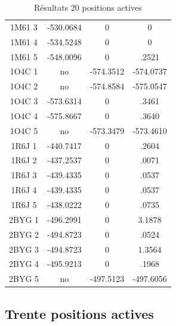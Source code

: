 \documentclass[a4paper,12pt]{article}
\begin{document}
\begin{table}[!htbp]
\begin{tabular}{|c|c|c|c|}
        1M61 3 & -530.0684 & 0 & 0 \\
        1M61 4 & -534.5248 & 0 & 0 \\
        1M61 5 & -548.0096 & 0 & .2521 \\
        1O4C 1 & no & -574.3512 & -574.0737 \\
        1O4C 2 & no & -574.8584 & -575.0547 \\
        1O4C 3 & -573.6314 & 0 & .3461 \\
        1O4C 4 & -575.8667 & 0 & .3640 \\
        1O4C 5 & no & -573.3479 & -573.4610 \\
        1R6J 1 & -440.7417 & 0 & .2604 \\
        1R6J 2 & -437.2537 & 0 & .0071  \\
        1R6J 3 & -439.4335 & 0 & .0537 \\
        1R6J 4 & -439.4335 & 0 & .0537 \\
        1R6J 5 & -438.0222 & 0 & .0735 \\
        2BYG 1 & -496.2991 & 0 & 3.1878 \\
        2BYG 2 & -494.8723 & 0 & .0524\\
        2BYG 3 & -494.8723 & 0 & 1.3564 \\
        2BYG 4 & -495.9213 & 0 & .1968 \\
        2BYG 5 & no & -497.5123 & -497.6056 \\
        
        \hline

 \end{tabular}      
 \caption{Résultats 20 positions actives }
 \label{tab_echec2BYG__1}      
\end{table}



   \subsection{ Trente positions actives}
\end{document}
